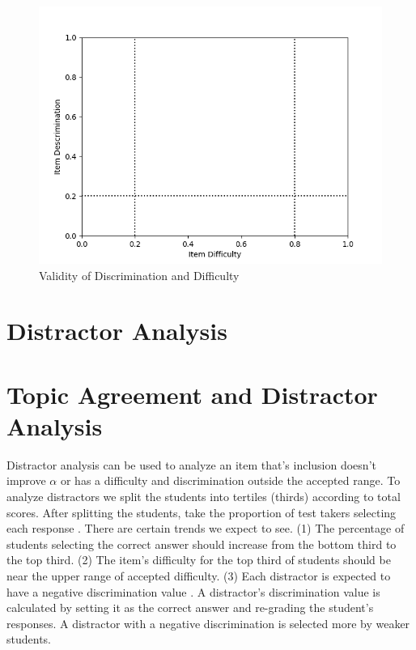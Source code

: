 \iflong
\begin{figure}[ht]
    \begin{center}
    \advance\leftskip-3cm
    \advance\rightskip-3cm
    \includegraphics[scale=.5]{images/graph.png}
    \caption{Validity of Discrimination and Difficulty}
    \label{fig:ideal}
\end{center}
\end{figure}
\fi

\iflong
\section{Distractor Analysis}
\fi
\ifshort
\section{Topic Agreement and Distractor Analysis}
\fi


Distractor analysis can be used to analyze an item that's inclusion doesn't improve $\alpha$ or has a difficulty and discrimination outside the accepted range. To analyze distractors we split the students into tertiles (thirds) according to total scores. After splitting the students, take the proportion of test takers selecting each response \cite{og_ctt}. There are certain trends we expect to see. (1) The percentage of students selecting the correct answer should increase from the bottom third to the top third. (2) The item's difficulty for the top third of students should be near the upper range of accepted difficulty. (3) Each distractor is expected to have a negative discrimination value \cite{distractor}. A distractor's discrimination value is calculated by setting it as the correct answer and re-grading the student's responses. A distractor with a negative discrimination is selected more by weaker students. %

